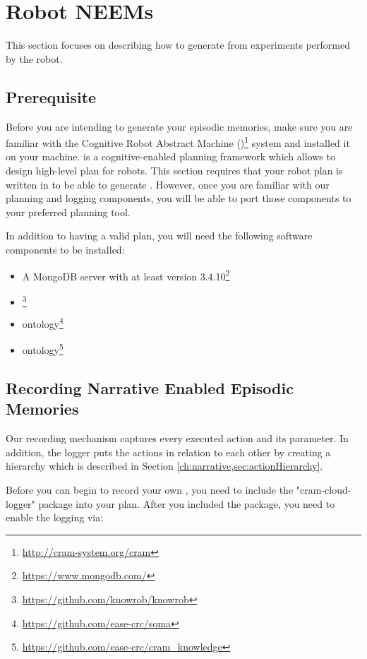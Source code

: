 \section{Robot NEEMs}
\label{sec:robot-neem}
\lstset{style=lispcode}
This section focuses on describing how to generate \neems from experiments performed by the robot. 

\subsection{Prerequisite}

Before you are intending to generate your episodic memories, make sure you are familiar with the Cognitive Robot Abstract Machine (\cram)\footnote{\url{http://cram-system.org/cram}} system and installed it on your machine.
\cram is a cognitive-enabled planning framework which allows to design high-level plan for robots.
This section requires that your robot plan is written in \cram to be able to generate \neems.
However, once you are familiar with our planning and logging components, you will be able to port those components to your preferred planning tool.

In addition to having a valid \cram plan, you will need the following software components to be installed:
\begin{itemize}
	\item A MongoDB server with at least version 3.4.10\footnote{\url{https://www.mongodb.com/}}
	\item \knowrob\footnote{\url{https://github.com/knowrob/knowrob}}
	\item \soma ontology\footnote{\url{https://github.com/ease-crc/soma}}
	\item \cram ontology\footnote{\url{https://github.com/ease-crc/cram\_knowledge}}
\end{itemize}


\subsection{Recording Narrative Enabled Episodic Memories}
Our recording mechanism  captures every executed \cram action and its parameter.
In addition, the logger puts the actions in relation to each other by creating a hierarchy which is described in Section \ref{ch:narrative,sec:actionHierarchy}.

Before you can begin to record your own \neems, you need to include the "cram-cloud-logger" package into your \cram plan.
After you included the package, you need to enable the logging via:


